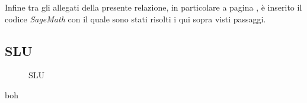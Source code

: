 Infine tra gli allegati della presente relazione, in particolare a pagina \pageref{cap:codiceTrave}, è inserito il codice \emph{SageMath} con il quale sono stati risolti i qui sopra visti passaggi.
\clearpage	
\begin{landscape}
\subsection*{SLU}
\begin{figure}[H]
\centering
{} 
\caption{SLU}
\label{fig:Momenti_ULS}
\end{figure}
\begin{table}[H]
\centering
\caption{boh}
	\begin{tabular}{lS[table-format=3.2]S[table-format=3.2]S[table-format=3.2]S[table-format=3.2]S[table-format=3.2]S[table-format=3.2]S[table-format=3.2]S[table-format=3.2]S[table-format=3.2]S[table-format=3.2]S[table-format=3.2]S[table-format=3.2]S[table-format=3.2]}

\end{tabular}
\end{table}
\end{landscape}
